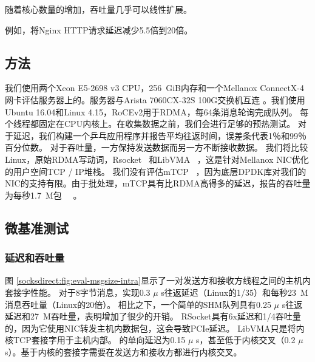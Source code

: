 

随着核心数量的增加，吞吐量几乎可以线性扩展。


例如，\sys  {}将Nginx HTTP请求延迟减少5.5倍到20倍。


\subsection{方法}
\label{socksdirect:subsec:methodology}

我们使用两个Xeon E5-2698 v3 CPU，256~GiB内存和一个Mellanox ConnectX-4网卡评估服务器上的\sys 。服务器与Arista 7060CX-32S 100G交换机互连 \cite {arista-7060cx}。我们使用Ubuntu 16.04和Linux 4.15，RoCEv2用于RDMA，每64条消息轮询完成队列。
每个线程都固定在CPU内核上。在收集数据之前，我们会进行足够的预热测试。
对于延迟，我们构建一个乒乓应用程序并报告平均往返时间，误差条代表1％和99％百分位数。
对于吞吐量，一方保持发送数据而另一方不断接收数据。
我们将比较Linux，原始RDMA写动词，Rsocket~ \cite {rsockets}和LibVMA~ \cite {libvma}，这是针对Mellanox NIC优化的用户空间TCP / IP堆栈。
我们没有评估mTCP~ \cite {jeong2014mtcp}，因为底层DPDK库对我们的NIC的支持有限。由于批处理，mTCP具有比RDMA高得多的延迟，报告的吞吐量为每秒1.7~M包~~ \cite {kalia2018datacenter}。

\subsection{微基准测试}
\label{socksdirect:subsec:microbenchmark}

\subsubsection{延迟和吞吐量}



图 \ref {socksdirect:fig:eval-msgsize-intra}显示了一对发送方和接收方线程之间的主机内套接字性能。
对于8字节消息，\sys 实现0.3 $ \mu $ s往返延迟（Linux的1/35）和每秒23~M消息吞吐量（Linux的20倍）。
相比之下，一个简单的SHM队列具有0.25 $ \mu $ s往返延迟和27~M吞吐量，表明\sys 增加了很少的开销。
RSocket具有6x延迟和1/4吞吐量的\sys  {}，因为它使用NIC转发主机内数据包，这会导致PCIe延迟。
LibVMA只是将内核TCP套接字用于主机内部。
\sys  {}的单向延迟为0.15 $ \mu $ s，甚至低于内核交叉（0.2 $ \mu $ s）。基于内核的套接字需要在发送方和接收方都进行内核交叉。

